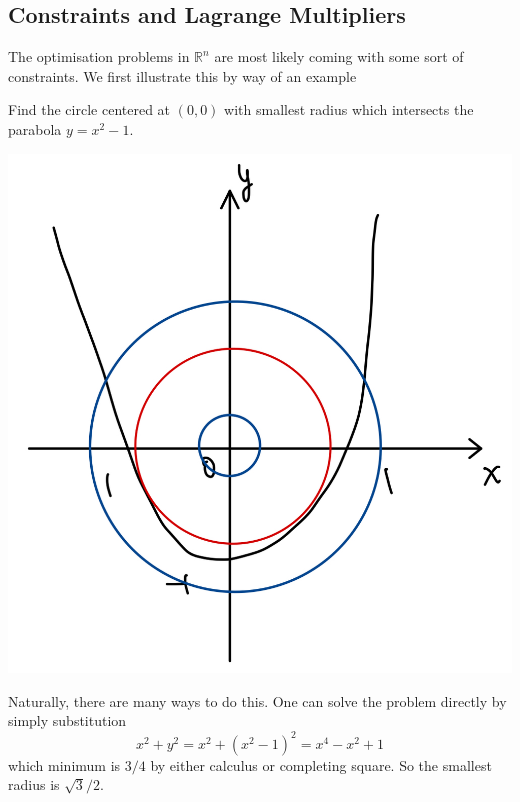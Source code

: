 \documentclass{article}
\begin{document}
\subsection{Constraints and Lagrange Multipliers}
The optimisation problems in $\mathbb R^n$ are most likely coming with some sort of constraints.
We first illustrate this by way of an example
\begin{example}
    Find the circle centered at $(0,0)$ with smallest radius which intersects the parabola $y=x^2-1$.

    \begin{center}
        \includegraphics[scale=0.14]{best_fit_circ.jpeg}
    \end{center}
    
    Naturally, there are many ways to do this.
    One can solve the problem directly by simply substitution
    $$x^2+y^2=x^2+(x^2-1)^2=x^4-x^2+1$$
    which minimum is $3/4$ by either calculus or completing square.
    So the smallest radius is $\sqrt{3}/2$.


\end{example}
\end{document}
